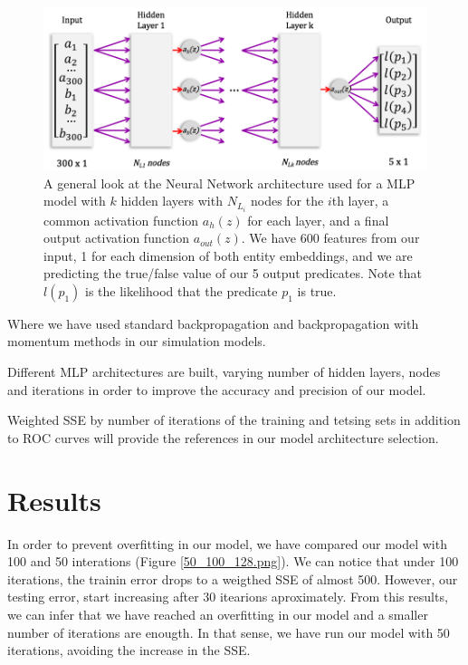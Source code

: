 \documentclass[11.5pt]{article}
\newcounter{Figure}
\newcounter{graphics}
\begin{document}
\begin{figure}[h!]
 \includegraphics[width=1\textwidth]{report_mlp/GenArchitecture.png}
  \caption{A general look at the Neural Network architecture used for a MLP model with $k$ hidden layers with $N_{L_i}$ nodes for the $i$th layer, a common activation function $a_h(z)$ for each layer, and a final output activation function $a_{out}(z)$. We have 600 features from our input, 1 for each dimension of both entity embeddings, and we are predicting the true/false value of our 5 output predicates. Note that $l(p_1)$ is the likelihood that the predicate $p_1$ is true.  }
  \label{MLPArch}
\end{figure}


Where we have used standard backpropagation and backpropagation with momentum methods in our simulation models.

Different  MLP architectures are built, varying number of hidden layers, nodes and iterations in order to improve the accuracy and precision of our model.

Weighted SSE by number of iterations of the training and tetsing sets in addition to ROC curves will provide the references in our model architecture selection.

\section{Results}

In order to prevent overfitting in our model, we have compared our model with 100 and 50 interations (Figure \ref{50_100_128.png}). We can notice that under 100 iterations, the trainin error drops to a weigthed SSE of almost 500. However, our testing error, start increasing after 30 itearions aproximately. From this results, we can infer that we have reached an overfitting in our model and a smaller number of iterations are enougth. In that sense, we have run our model with 50 iterations, avoiding the increase in the SSE.\par
 
\end{document}
